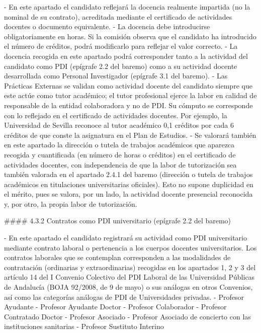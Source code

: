 \documentclass{article}
\begin{document}
\begin{itemize}
\begin{itemize}
\begin{scriptsize}
                  - En este apartado el candidato reflejará la docencia realmente impartida (no la nominal de su contrato), acreditada mediante el certificado de actividades docentes o documento equivalente.
                  - La docencia debe introducirse obligatoriamente en horas. Si la comisión observa que el candidato ha introducido el número de créditos, podrá modificarlo para reflejar el valor correcto.
                  - La docencia recogida en este apartado podrá corresponder tanto a la actividad del candidato como PDI (epígrafe 2.2 del baremo) como a su actividad docente desarrollada como Personal Investigador (epígrafe 3.1 del baremo).
                  - Las Prácticas Externas se validan como actividad docente del candidato siempre que este actúe como tutor académico; el tutor profesional ejerce la labor en calidad de responsable de la entidad colaboradora y no de PDI. Su cómputo se corresponde con lo reflejado en el certificado de actividades docentes. Por ejemplo, la Universidad de Sevilla reconoce al tutor académico 0,1 créditos por cada 6 créditos de que conste la asignatura en el Plan de Estudios.
                  - Se valorará también en este apartado la dirección o tutela de trabajos académicos que aparezca recogida y cuantificada (en número de horas o créditos) en el certificado de actividades docentes, con independencia de que la labor de tutorización sea también valorada en el apartado 2.4.1 del baremo (dirección o tutela de trabajos académicos en titulaciones universitarias oficiales). Esto no supone duplicidad en el mérito, pues se valora, por un lado, la actividad docente presencial reconocida y, por otro, la propia labor de tutorización.

                  \#\#\#\# 4.3.2 Contratos como PDI universitario (epígrafe 2.2 del baremo)

                  - En este apartado el candidato registrará su actividad como PDI universitario mediante contrato laboral o pertenencia a los cuerpos docentes universitarios. Los contratos laborales que se contemplan corresponden a las modalidades de contratación (ordinarias y extraordinarias) recogidas en los apartados 1, 2 y 3 del artículo 14 del I Convenio Colectivo del PDI Laboral de las Universidad Públicas de Andalucía (BOJA 92/2008, de 9 de mayo) o sus análogas en otros Convenios, así como las categorías análogas de PDI de Universidades privadas.
                  - Profesor Ayudante
                  - Profesor Ayudante Doctor
                  - Profesor Colaborador
                  - Profesor Contratado Doctor
                  - Profesor Asociado
                  - Profesor Asociado de concierto con las instituciones sanitarias
                  - Profesor Sustituto Interino


\end{scriptsize}
\end{itemize}
\end{itemize}
\end{document}

